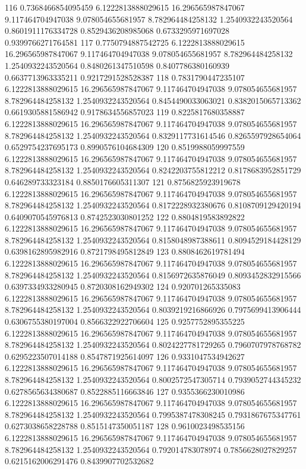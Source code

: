 {116 0.7368466854095459 6.1222813888029615 16.296565987847067 9.117464704947038 9.078054655681957 8.782964484258132 1.2540932243520564 0.8601911176334728 0.8529436208985068 0.6733295971697028 0.9399766271764581
117 0.7750794887542725 6.1222813888029615 16.296565987847067 9.117464704947038 9.078054655681957 8.782964484258132 1.2540932243520564 0.8480261347510598 0.8407786380160939 0.6637713963335211 0.9217291528528387
118 0.7831790447235107 6.1222813888029615 16.296565987847067 9.117464704947038 9.078054655681957 8.782964484258132 1.2540932243520564 0.8454490033063021 0.8382015065713362 0.6619305881586942 0.9178634556857023
119 0.8225817680358887 6.1222813888029615 16.296565987847067 9.117464704947038 9.078054655681957 8.782964484258132 1.2540932243520564 0.8329117731614546 0.8265597928654064 0.6529754237695173 0.8990576104684309
120 0.8519988059997559 6.1222813888029615 16.296565987847067 9.117464704947038 9.078054655681957 8.782964484258132 1.2540932243520564 0.8242203755812212 0.8178683952851729 0.646289733323184 0.8850176605311307
121 0.8756825923919678 6.1222813888029615 16.296565987847067 9.117464704947038 9.078054655681957 8.782964484258132 1.2540932243520564 0.8172228932380676 0.8108709129420194 0.6409070545976813 0.8742523030801252
122 0.8804819583892822 6.1222813888029615 16.296565987847067 9.117464704947038 9.078054655681957 8.782964484258132 1.2540932243520564 0.8158048987388611 0.8094529184428129 0.6398162895982916 0.8721798495812849
123 0.8808462619781494 6.1222813888029615 16.296565987847067 9.117464704947038 9.078054655681957 8.782964484258132 1.2540932243520564 0.8156972635876049 0.8093452832915566 0.6397334933280945 0.8720308162949302
124 0.920701265335083 6.1222813888029615 16.296565987847067 9.117464704947038 9.078054655681957 8.782964484258132 1.2540932243520564 0.8039219216866926 0.7975699413906444 0.6306755380197004 0.8566322922706604
125 0.9257752895355225 6.1222813888029615 16.296565987847067 9.117464704947038 9.078054655681957 8.782964484258132 1.2540932243520564 0.8024227781729265 0.7960707978768782 0.6295223507014188 0.8547871925614097
126 0.9331047534942627 6.1222813888029615 16.296565987847067 9.117464704947038 9.078054655681957 8.782964484258132 1.2540932243520564 0.8002572547305714 0.7939052744345232 0.6278565634380687 0.8522885116663846
127 0.9355366230010986 6.1222813888029615 16.296565987847067 9.117464704947038 9.078054655681957 8.782964484258132 1.2540932243520564 0.7995387478308245 0.7931867675347761 0.6273038658228788 0.8515147350051187
128 0.9610023498535156 6.1222813888029615 16.296565987847067 9.117464704947038 9.078054655681957 8.782964484258132 1.2540932243520564 0.792014783078974 0.7856628027829257 0.6215162006291476 0.8439907702532682
}

